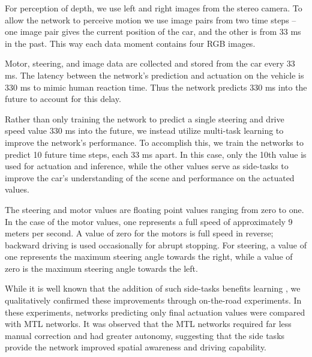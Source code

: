 For perception of depth, we use left and right images from the stereo camera. To allow the network to perceive motion we use image pairs from two time steps -- one image pair gives the current position of the car, and the other is from 33 ms in the past. This way each data moment contains four RGB images.

Motor, steering, and image data are collected and stored from the car every 33 ms.
The latency between the network's prediction and actuation on the vehicle is 330 ms to mimic human reaction time. Thus the network predicts 330 ms into the future to account for this delay.

Rather than only training the network to predict a single steering and drive speed value 330 ms into the future, we instead utilize multi-task learning to improve the network's performance. To accomplish this, we train the networks to predict 10 future time steps, each 33 ms apart. In this case, only the 10th value is used for actuation and inference, while the other values serve as side-tasks to improve the car's understanding of the scene and performance on the actuated values.

The steering and motor values are floating point values ranging from zero to one. In the case of the motor values, one represents a full speed of approximately 9 meters per second. A value of zero for the motors is full speed in reverse; backward driving is used occasionally for abrupt stopping. For steering, a value of one represents the maximum steering angle towards the right, while a value of zero is the maximum steering angle towards the left.

While it is well known that the addition of such side-tasks benefits learning \cite{caruana1998multitask}, we qualitatively confirmed these improvements through on-the-road experiments. In these experiments, networks predicting only final actuation values were compared with MTL networks. It was observed that the MTL networks required far less manual correction and had greater autonomy, suggesting that the side tasks provide the network improved spatial awareness and driving capability.
